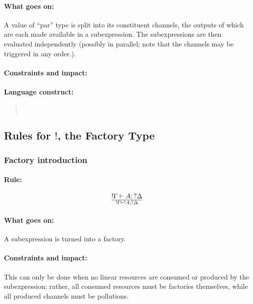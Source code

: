 \documentclass[a4paper]{article}
\begin{document}
\paragraph{What goes on:} A value of ``par'' type is split into its
constituent channels, the outputs of which are each made available in
a subexpression. The subexpressions are then evaluated independently
(possibly in parallel; note that the channels may be triggered in any order.).

\paragraph{Constraints and impact:}
\paragraph{Language construct:}
\begin{quote}\tt
\end{quote}


\subsection{Rules for $!$, the Factory Type}

\subsubsection{Factory introduction}


\paragraph{Rule:}
$$
{
  !\Gamma \vdash A; ?\Delta
}\over{
  !\Gamma \vdash !A; ?\Delta
}
$$
\paragraph{What goes on:} A subexpression is turned into a factory.

\paragraph{Constraints and impact:} This can only be done when no
linear resources are consumed or produced by the subexpression;
rather, all consumed resources must be factories themselves, while all
produced channels must be pollutions.
\end{document}

